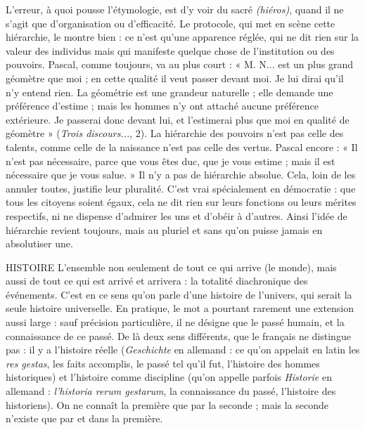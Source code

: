 L'erreur, à quoi pousse l’étymologie, est d’y voir du sacré {\it (hiéros)}, quand il ne
s’agit que d'organisation ou d'efficacité. Le protocole, qui met en scène cette
hiérarchie, le montre bien : ce n’est qu’une apparence réglée, qui ne dit rien sur
la valeur des individus mais qui manifeste quelque chose de l'institution ou des
pouvoirs. Pascal, comme toujours, va au plus court : « M. N... est un plus
grand géomètre que moi ; en cette qualité il veut passer devant moi. Je lui dirai
qu'il n’y entend rien. La géométrie est une grandeur naturelle ; elle demande
une préférence d’estime ; mais les hommes n’y ont attaché aucune préférence
extérieure. Je passerai donc devant lui, et l’estimerai plus que moi en qualité de
géomètre » ({\it Trois discours...}, 2). La hiérarchie des pouvoirs n’est pas celle des
talents, comme celle de la naissance n’est pas celle des vertus. Pascal encore :
« Il n’est pas nécessaire, parce que vous êtes duc, que je vous estime ; mais il est
nécessaire que je vous salue. » Il n’y a pas de hiérarchie absolue. Cela, loin de
les annuler toutes, justifie leur pluralité. C’est vrai spécialement en démocratie :
que tous les citoyens soient égaux, cela ne dit rien sur leurs fonctions ou leurs
mérites respectifs, ni ne dispense d’admirer les uns et d’obéir à d’autres. Ainsi
l’idée de hiérarchie revient toujours, mais au pluriel et sans qu’on puisse jamais
en absolutiser une.

HISTOIRE L'ensemble non seulement de tout ce qui arrive (le monde),
mais aussi de tout ce qui est arrivé et arrivera : la totalité diachronique
des événements. C’est en ce sens qu’on parle d’une histoire de l’univers,
qui serait la seule histoire universelle. En pratique, le mot a pourtant rarement
une extension aussi large : sauf précision particulière, il ne désigne que le
passé humain, et la connaissance de ce passé. De là deux sens différents, que le
français ne distingue pas : il y a l’histoire réelle ({\it Geschichte} en allemand : ce
qu'on appelait en latin les {\it res gestas}, les faits accomplis, le passé tel qu’il fut,
l’histoire des hommes historiques) et l’histoire comme discipline (qu’on appelle
parfois {\it Historie} en allemand : {\it l’historia rerum gestarum}, la connaissance du
passé, l’histoire des historiens). On ne connaît la première que par la seconde ;
mais la seconde n’existe que par et dans la première.

